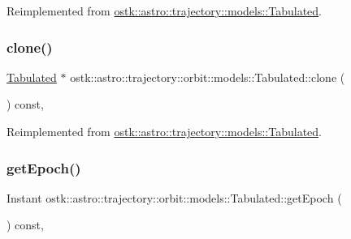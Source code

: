 Reimplemented from \hyperlink{classostk_1_1astro_1_1trajectory_1_1models_1_1_tabulated_af2ebaa6456986636aa58c2f8666ed0b9}{ostk\+::astro\+::trajectory\+::models\+::\+Tabulated}.

\mbox{\label{classostk_1_1astro_1_1trajectory_1_1orbit_1_1models_1_1_tabulated_a53603727c33f9ff8db520831cf666142}} 
\subsubsection{\texorpdfstring{clone()}{clone()}}
{\footnotesize\ttfamily \hyperlink{classostk_1_1astro_1_1trajectory_1_1orbit_1_1models_1_1_tabulated}{Tabulated} $\ast$ ostk\+::astro\+::trajectory\+::orbit\+::models\+::\+Tabulated\+::clone (\begin{DoxyParamCaption}{ }\end{DoxyParamCaption}) const\hspace{0.3cm}{\ttfamily [override]}, {\ttfamily [virtual]}}



Reimplemented from \hyperlink{classostk_1_1astro_1_1trajectory_1_1models_1_1_tabulated_a553d2c4027ce269c1c2b3f4e9c65e14d}{ostk\+::astro\+::trajectory\+::models\+::\+Tabulated}.

\mbox{\label{classostk_1_1astro_1_1trajectory_1_1orbit_1_1models_1_1_tabulated_a0e92ebaac60e5113989eaadc66062b75}} 
\subsubsection{\texorpdfstring{get\+Epoch()}{getEpoch()}}
{\footnotesize\ttfamily Instant ostk\+::astro\+::trajectory\+::orbit\+::models\+::\+Tabulated\+::get\+Epoch (\begin{DoxyParamCaption}{ }\end{DoxyParamCaption}) const\hspace{0.3cm}{\ttfamily [override]}, {\ttfamily [virtual]}}



